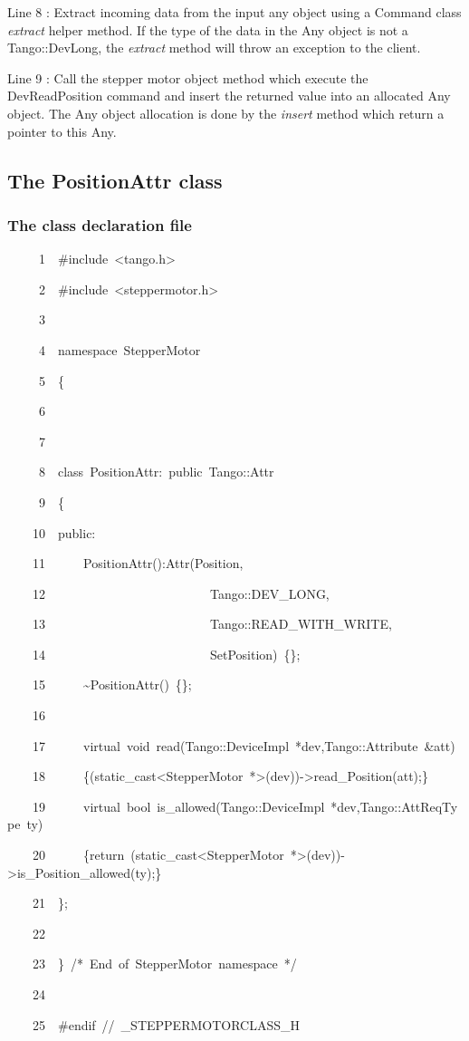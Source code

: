 Line 8 : Extract incoming data from the input any object using a Command
class \emph{extract} helper method. If the type of the data in the
Any object is not a Tango::DevLong, the \emph{extract}
method will throw an exception to the client.

Line 9 : Call the stepper motor object method which execute the DevReadPosition
command and insert the returned value into an allocated Any object.
The Any object allocation is done by the \emph{insert}
method which return a pointer to this Any.


\subsection{The PositionAttr class}


\subsubsection{The class declaration file}


\begin{lyxcode}
~~~~~1~~\#include~<tango.h>

~~~~~2~~\#include~<steppermotor.h>

~~~~~3~~

~~~~~4~~namespace~StepperMotor

~~~~~5~~\{

~~~~~6~~

~~~~~7~~

~~~~~8~~class~PositionAttr:~public~Tango::Attr

~~~~~9~~\{

~~~~10~~public:

~~~~11~~~~~~PositionAttr():Attr(\textquotedbl{}Position\textquotedbl{},

~~~~12~~~~~~~~~~~~~~~~~~~~~~~~~~Tango::DEV\_LONG,

~~~~13~~~~~~~~~~~~~~~~~~~~~~~~~~Tango::READ\_WITH\_WRITE,

~~~~14~~~~~~~~~~~~~~~~~~~~~~~~~~\textquotedbl{}SetPosition\textquotedbl{})~\{\};

~~~~15~~~~~~\textasciitilde{}PositionAttr()~\{\};

~~~~16~~~~~~~~~~

~~~~17~~~~~~virtual~void~read(Tango::DeviceImpl~{*}dev,Tango::Attribute~\&att)

~~~~18~~~~~~\{(static\_cast<StepperMotor~{*}>(dev))->read\_Position(att);\}

~~~~19~~~~~~virtual~bool~is\_allowed(Tango::DeviceImpl~{*}dev,Tango::AttReqType~ty)

~~~~20~~~~~~\{return~(static\_cast<StepperMotor~{*}>(dev))->is\_Position\_allowed(ty);\}

~~~~21~~\};

~~~~22~~

~~~~23~~\}~/{*}~End~of~StepperMotor~namespace~{*}/

~~~~24~~

~~~~25~~\#endif~//~\_STEPPERMOTORCLASS\_H
\end{lyxcode}


